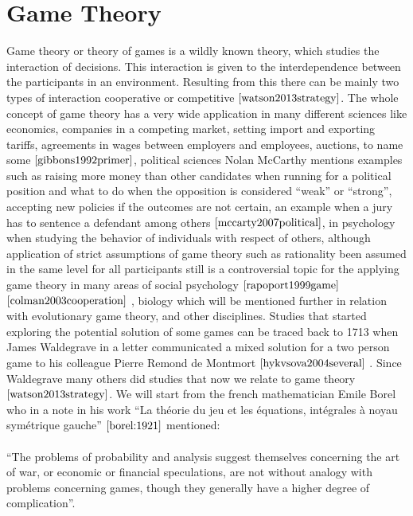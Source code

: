 \documentclass{book}
\begin{document}
\newpage
\section{Game Theory}
\label{Literature:gt}
Game theory or theory of games is a wildly known theory, which studies the interaction of decisions. This interaction is given to the interdependence between the participants in an environment. Resulting from this there can be mainly two types of interaction cooperative or competitive $\cite{watson2013strategy}$. The whole concept of game theory has a very wide application in many different sciences like economics, companies in a competing market, setting import and exporting tariffs, agreements in wages between employers and employees, auctions, to name some $\cite{gibbons1992primer}$, political sciences Nolan McCarthy mentions examples such as raising more money than other candidates when running for a political position and what to do when the opposition is considered “weak” or “strong”, accepting new policies if the outcomes are not certain,  an example when a jury has to sentence a defendant among others $\cite{mccarty2007political}$, in psychology when studying the behavior of individuals with respect of others, although application of strict assumptions of game theory such as rationality been assumed in the same level for all participants still is a controversial topic for the applying game theory in many areas of social psychology $\cite{rapoport1999game}$ $\cite{colman2003cooperation}$ , biology which will be mentioned further in relation with evolutionary game theory, and other disciplines. Studies that started exploring the potential solution of some games can be traced back to 1713  when James Waldegrave in a letter communicated a mixed solution for a two person game to his colleague Pierre Remond de Montmort $\cite{hykvsova2004several}$ . Since Waldegrave many others did studies that now we relate to game theory $\cite{watson2013strategy}$.  We will start from the french mathematician Emile Borel who in a note in his work ``La th\'{e}orie du jeu et les \'{e}quations, int\'{e}grales \`{a} noyau sym\'{e}trique gauche'' $\cite{borel:1921}$ mentioned:
\\\\ ``The problems of probability and analysis suggest themselves concerning the art of war, or economic or financial speculations, are not without analogy with problems concerning games, though they generally have a higher degree of complication''.
\end{document}
